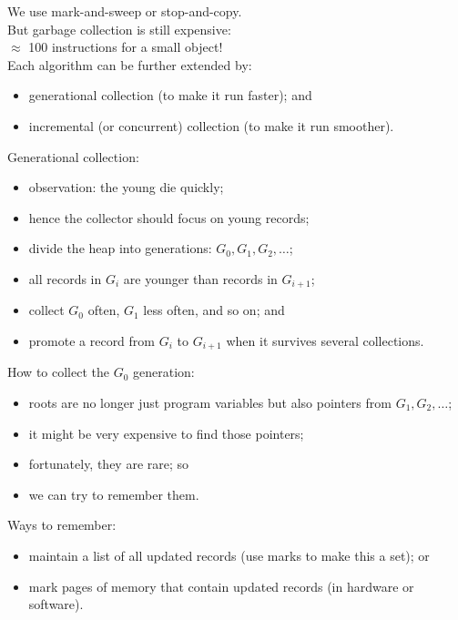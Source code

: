 \begin{slide*}
We use mark-and-sweep or stop-and-copy.\\

But garbage collection is still expensive:\\
$\approx$ 100 instructions for a small object!\\

Each algorithm can be further extended by:

\begin{itemize}
\item generational collection (to make it run faster); and
\item incremental (or concurrent) collection (to make it run smoother).
\end{itemize}
\vfil
\end{slide*}
 
\begin{slide*}
Generational collection:
\begin{itemize}
\item observation: the young die quickly;
\item hence the collector should focus on young records;
\item divide the heap into generations: $G_0, G_1, G_2, \ldots$;
\item all records in $G_i$ are younger than records in $G_{i+1}$;
\item collect $G_0$ often, $G_1$ less often, and so on; and
\item promote a record from $G_i$ to $G_{i+1}$ when it survives several collections.
\end{itemize}
\vfil
\end{slide*}
 
\begin{slide*}
How to collect the $G_0$ generation:
\begin{itemize}
\item roots are no longer just program variables but also pointers from
$G_1, G_2, \ldots$;
\item it might be very expensive to find those pointers;
\item fortunately, they are rare; so
\item we can try to remember them.
\end{itemize}

Ways to remember:
\begin{itemize}
\item maintain a list of all updated records (use marks to make this a set); or
\item mark pages of memory that contain updated records (in hardware or software).
\end{itemize}
\vfil
\end{slide*}
 
